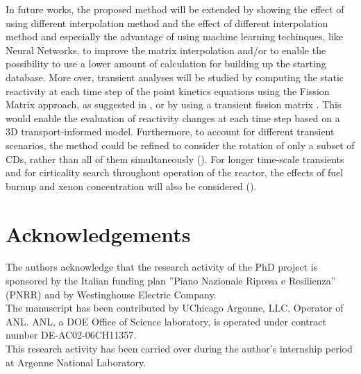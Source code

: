 \documentclass[preprint,review,12pt]{elsarticle}
\begin{document}
In future works, the proposed method will be extended by showing the effect of using different interpolation method and the effect of different interpolation method and especially the advantage of using machine learning techinques, like Neural Networks, to improve the matrix interpolation and/or to enable the possibility to use  a lower amount of calculation for building up the starting database. 
More over, transient analyses will be studied by computing the static reactivity at each time step of the point kinetics equations using the Fission Matrix approach, as suggested in \cite{Dalinger2024}, or by using a transient fission matrix \cite{Mascolino2024}. This would enable the evaluation of reactivity changes at each time step based on a 3D transport-informed model. Furthermore, to account for different transient scenarios, the method could be refined to consider the rotation of only a subset of CDs, rather than all of them simultaneously (\cite{Mascolino2022}). For longer time-scale transients and for cirticality search throughout operation of the reactor, the effects of fuel burnup and xenon concentration will also be considered (\cite{Roskoff2018,Pungerčič}).

\section*{Acknowledgements}
The authors acknowledge that the research activity of the PhD project is sponsored by the Italian funding plan ”Piano Nazionale Ripresa e Resilienza” (PNRR) and by Westinghouse Electric Company. \\ The manuscript has been contributed by UChicago Argonne, LLC, Operator of ANL. ANL, a DOE Office of Science laboratory, is operated under contract number DE-AC02-06CH11357. \\
This research activity has been carried over during the author’s internship period at Argonne National Laboratory.
 

\end{document}
